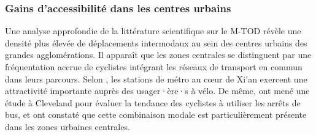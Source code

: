 \begin{refsegment}
\subsubsection*{Gains d'accessibilité dans les centres urbains
    \label{chap2:gains-accessibilite-urbain}
    }
    
Une analyse approfondie de la littérature scientifique sur le \acrshort{M-TOD} révèle une densité plus élevée de déplacements intermodaux au sein des centres urbains des grandes agglomérations. Il apparaît que les zones centrales se distinguent par une fréquentation accrue de cyclistes intégrant les réseaux de transport en commun dans leurs parcours. Selon \textcolor{blue}{\textcite[5]{zhu_improved_2021}}, les stations de métro au cœur de Xi'an exercent une attractivité importante auprès des usager·ère·s à vélo. De même, \textcolor{blue}{\textcite[79-81]{flamm_determinants_2013}} ont mené une étude à Cleveland pour évaluer la tendance des cyclistes à utiliser les arrêts de bus, et ont constaté que cette combinaison modale est particulièrement présente dans les zones urbaines centrales.%


\end{refsegment}
